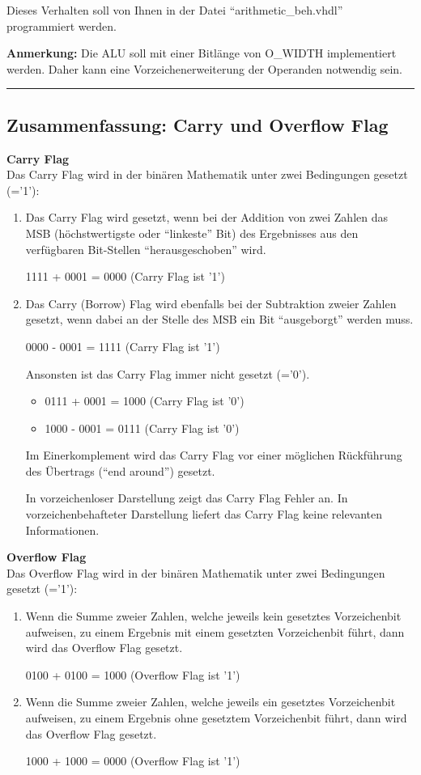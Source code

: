 \documentclass[a4paper,12pt]{article}
\begin{document}
Dieses Verhalten soll von Ihnen in der Datei "`arithmetic\_beh.vhdl"' programmiert werden.


\textbf{Anmerkung:} Die ALU soll mit einer Bitl\"ange von {{O_WIDTH}} implementiert werden. Daher kann eine Vorzeichenerweiterung der Operanden notwendig sein.

\rule{16cm}{0.4pt}\par
\subsection*{Zusammenfassung: Carry und Overflow Flag}

\textbf{Carry Flag}\\
Das Carry Flag wird in der bin\"aren Mathematik unter zwei Bedingungen gesetzt (='1'):
\begin{enumerate}
\item Das Carry Flag wird gesetzt, wenn bei der Addition von zwei Zahlen das MSB (h\"ochstwertigste oder "`linkeste"' Bit) des Ergebnisses aus den verf\"ugbaren Bit-Stellen "`herausgeschoben"' wird.

   1111 + 0001 = 0000 (Carry Flag ist '1')

\item Das Carry (Borrow) Flag wird ebenfalls bei der Subtraktion zweier Zahlen gesetzt, wenn dabei an der Stelle des MSB ein Bit "`ausgeborgt"' werden muss.

   0000 - 0001 = 1111 (Carry Flag ist '1')

Ansonsten ist das Carry Flag immer nicht gesetzt (='0').

\begin{itemize}
\item 0111 + 0001 = 1000 (Carry Flag ist '0')
\item 1000 - 0001 = 0111 (Carry Flag ist '0')
\end{itemize}

Im Einerkomplement wird das Carry Flag vor einer m\"oglichen R\"uckf\"uhrung des \"Ubertrags ("`end around"') gesetzt.

In vorzeichenloser Darstellung zeigt das Carry Flag Fehler an.
In vorzeichenbehafteter Darstellung liefert das Carry Flag keine relevanten Informationen.


\end{enumerate}

\textbf{Overflow Flag}\\
Das Overflow Flag wird in der bin\"aren Mathematik unter zwei Bedingungen gesetzt (='1'):
\begin{enumerate}
\item Wenn die Summe zweier Zahlen, welche jeweils kein gesetztes Vorzeichenbit aufweisen, zu einem Ergebnis mit einem gesetzten Vorzeichenbit f\"uhrt, dann wird das Overflow Flag gesetzt.

   0100 + 0100 = 1000 (Overflow Flag ist '1')

\item Wenn die Summe zweier Zahlen, welche jeweils ein gesetztes Vorzeichenbit aufweisen, zu einem Ergebnis ohne gesetztem Vorzeichenbit f\"uhrt, dann wird das Overflow Flag gesetzt.

   1000 + 1000 = 0000 (Overflow Flag ist '1')
\end{enumerate}
\end{document}

